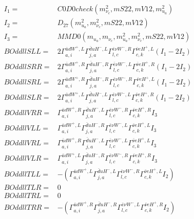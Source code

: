 \documentclass[A4,landscape]{article}
\begin{document}
\begin{align} 
I_1 = & C0D0check(m^2_{\nu_{{c}}}, mS22, mV12, m^2_{u_{{a}}}) \\ 
I_2 = & D_{27}(m^2_{u_{{a}}}, m^2_{\nu_{{c}}}, mS22, mV12) \\ 
I_3 = & MMD0(m_{u_{{a}}}, m_{\nu_{{c}}}, m^2_{u_{{a}}}, m^2_{\nu_{{c}}}, mS22, mV12) \\ 
  BOddllSLL= & 2  \Gamma^{\bar{u}d W^+ ,L}_{a, i} \Gamma^{\bar{d}u H^-,L}_{j, a} \Gamma^{\bar{e}\nu W^-,R}_{l, c} \Gamma^{\bar{\nu}e H^+ ,L}_{c, k} (I_1 - 2 I_2) \\ 
  BOddllSRR= & 2  \Gamma^{\bar{u}d W^+ ,R}_{a, i} \Gamma^{\bar{d}u H^-,R}_{j, a} \Gamma^{\bar{e}\nu W^-,L}_{l, c} \Gamma^{\bar{\nu}e H^+ ,R}_{c, k} (I_1 - 2 I_2) \\ 
  BOddllSRL= & 2  \Gamma^{\bar{u}d W^+ ,R}_{a, i} \Gamma^{\bar{d}u H^-,R}_{j, a} \Gamma^{\bar{e}\nu W^-,R}_{l, c} \Gamma^{\bar{\nu}e H^+ ,L}_{c, k} (I_1 - 2 I_2) \\ 
  BOddllSLR= & 2  \Gamma^{\bar{u}d W^+ ,L}_{a, i} \Gamma^{\bar{d}u H^-,L}_{j, a} \Gamma^{\bar{e}\nu W^-,L}_{l, c} \Gamma^{\bar{\nu}e H^+ ,R}_{c, k} (I_1 - 2 I_2) \\ 
  BOddllVRR= &  \Gamma^{\bar{u}d W^+ ,R}_{a, i} \Gamma^{\bar{d}u H^-,L}_{j, a} \Gamma^{\bar{e}\nu W^-,R}_{l, c} \Gamma^{\bar{\nu}e H^+ ,R}_{c, k} I_3 \\ 
  BOddllVLL= &  \Gamma^{\bar{u}d W^+ ,L}_{a, i} \Gamma^{\bar{d}u H^-,R}_{j, a} \Gamma^{\bar{e}\nu W^-,L}_{l, c} \Gamma^{\bar{\nu}e H^+ ,L}_{c, k} I_3 \\ 
  BOddllVRL= &  \Gamma^{\bar{u}d W^+ ,R}_{a, i} \Gamma^{\bar{d}u H^-,L}_{j, a} \Gamma^{\bar{e}\nu W^-,L}_{l, c} \Gamma^{\bar{\nu}e H^+ ,L}_{c, k} I_3 \\ 
  BOddllVLR= &  \Gamma^{\bar{u}d W^+ ,L}_{a, i} \Gamma^{\bar{d}u H^-,R}_{j, a} \Gamma^{\bar{e}\nu W^-,R}_{l, c} \Gamma^{\bar{\nu}e H^+ ,R}_{c, k} I_3 \\ 
  BOddllTLL= & -( \Gamma^{\bar{u}d W^+ ,L}_{a, i} \Gamma^{\bar{d}u H^-,L}_{j, a} \Gamma^{\bar{e}\nu W^-,R}_{l, c} \Gamma^{\bar{\nu}e H^+ ,L}_{c, k} I_2) \\ 
  BOddllTLR= & 0 \\ 
  BOddllTRL= & 0 \\ 
  BOddllTRR= & -( \Gamma^{\bar{u}d W^+ ,R}_{a, i} \Gamma^{\bar{d}u H^-,R}_{j, a} \Gamma^{\bar{e}\nu W^-,L}_{l, c} \Gamma^{\bar{\nu}e H^+ ,R}_{c, k} I_2) \\ 
\end{align} 
\end{document}

